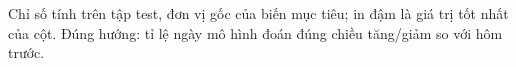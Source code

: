 Chỉ số tính trên tập test, đơn vị gốc của biến mục tiêu; in đậm là giá trị tốt nhất của cột. Đúng hướng: tỉ lệ ngày mô hình đoán đúng chiều tăng/giảm so với hôm trước.
